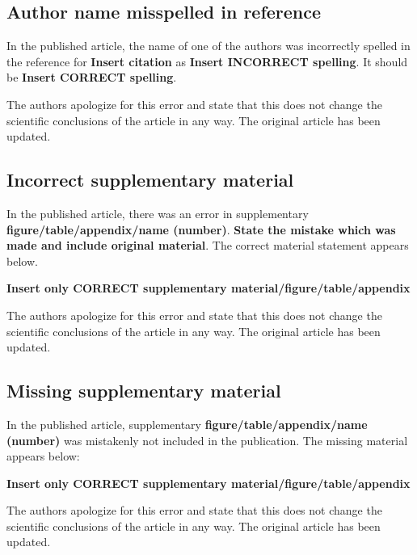 \documentclass[utf8]{frontiers_correction}
\begin{document}
\vspace{5mm}
\subsection*{Author name misspelled in reference}
In the published article, the name of one of the authors was incorrectly spelled in the reference for \textbf{Insert citation} as \textbf{Insert INCORRECT spelling}. It should be \textbf{Insert CORRECT spelling}.\par The authors apologize for this error and state that this does not change the scientific conclusions of the article in any way. The original article has been updated.


\vspace{5mm}
\subsection*{Incorrect supplementary material }
In the published article, there was an error in supplementary \textbf{figure/table/appendix/name (number)}. \textbf{State the mistake which was made and include original material}. The correct material statement appears below.\par
\textbf{Insert only CORRECT supplementary material/figure/table/appendix}\par
The authors apologize for this error and state that this does not change the scientific conclusions of the article in any way. The original article has been updated.


\vspace{5mm}
\subsection*{Missing supplementary material }
In the published article, supplementary \textbf{figure/table/appendix/name (number)} was mistakenly not included in the publication. The missing material appears below:\par
\textbf{Insert only CORRECT supplementary material/figure/table/appendix}\par
The authors apologize for this error and state that this does not change the scientific conclusions of the article in any way. The original article has been updated.


\vspace{5mm}
\end{document}

